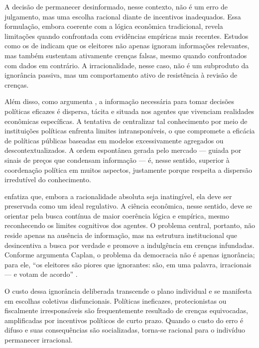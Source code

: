 A decisão de permanecer desinformado, nesse contexto, não é um erro de julgamento, mas uma escolha racional diante de incentivos inadequados. Essa formulação, embora coerente com a lógica econômica tradicional, revela limitações quando confrontada com evidências empíricas mais recentes. Estudos como os de  indicam que os eleitores não apenas ignoram informações relevantes, mas também sustentam ativamente crenças falsas, mesmo quando confrontados com dados em contrário. A irracionalidade, nesse caso, não é um subproduto da ignorância passiva, mas um comportamento ativo de resistência à revisão de crenças.

Além disso, como argumenta , a informação necessária para tomar decisões políticas eficazes é dispersa, tácita e situada nos agentes que vivenciam realidades econômicas específicas. A tentativa de centralizar tal conhecimento por meio de instituições políticas enfrenta limites intransponíveis, o que compromete a eficácia de políticas públicas baseadas em modelos excessivamente agregados ou descontextualizados. A ordem espontânea gerada pelo mercado — guiada por sinais de preços que condensam informação — é, nesse sentido, superior à coordenação política em muitos aspectos, justamente porque respeita a dispersão irredutível do conhecimento.

 enfatiza que, embora a racionalidade absoluta seja inatingível, ela deve ser preservada como um ideal regulativo. A ciência econômica, nesse sentido, deve se orientar pela busca contínua de maior coerência lógica e empírica, mesmo reconhecendo os limites cognitivos dos agentes. O problema central, portanto, não reside apenas na ausência de informação, mas na estrutura institucional que desincentiva a busca por verdade e promove a indulgência em crenças infundadas. Conforme argumenta Caplan, o problema da democracia não é apenas ignorância; para ele, ``os eleitores são piores que ignorantes: são, em uma palavra, irracionais — e votam de acordo'' \cite[p.~2]{The_Myth_of_the_Rational_Voter}.

O custo dessa ignorância deliberada transcende o plano individual e se manifesta em escolhas coletivas disfuncionais. Políticas ineficazes, protecionistas ou fiscalmente irresponsáveis são frequentemente resultado de crenças equivocadas, amplificadas por incentivos políticos de curto prazo. Quando o custo do erro é difuso e suas consequências são socializadas, torna-se racional para o indivíduo permanecer irracional.

